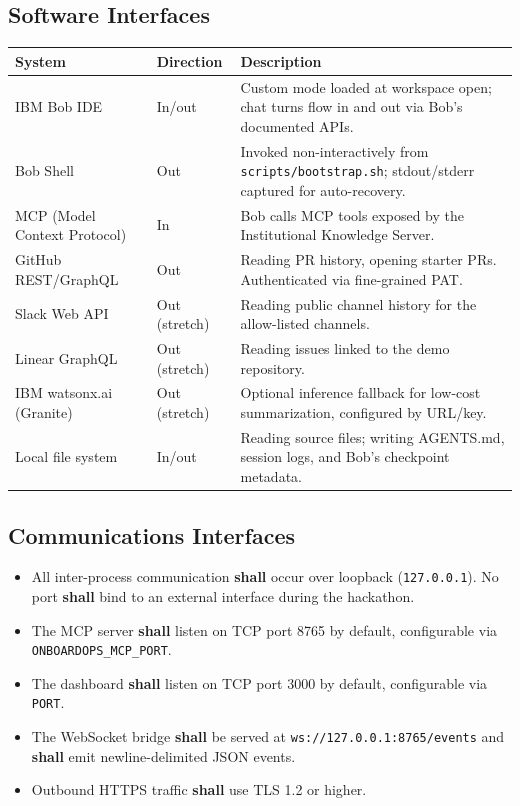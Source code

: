 \documentclass[11pt,letterpaper]{article}
\newcommand{\shall}{\textbf{shall}}
\begin{document}
\subsection{Software Interfaces}

\begin{longtable}{|p{3.4cm}|p{3.2cm}|p{7.4cm}|}
\hline
\textbf{System} & \textbf{Direction} & \textbf{Description} \\
\hline
\endhead
IBM Bob IDE & In/out & Custom mode loaded at workspace open; chat turns flow in and out via Bob's documented APIs. \\
\hline
Bob Shell & Out & Invoked non-interactively from \texttt{scripts/bootstrap.sh}; stdout/stderr captured for auto-recovery. \\
\hline
MCP (Model Context Protocol) & In & Bob calls MCP tools exposed by the Institutional Knowledge Server. \\
\hline
GitHub REST/GraphQL & Out & Reading PR history, opening starter PRs. Authenticated via fine-grained PAT. \\
\hline
Slack Web API & Out (stretch) & Reading public channel history for the allow-listed channels. \\
\hline
Linear GraphQL & Out (stretch) & Reading issues linked to the demo repository. \\
\hline
IBM watsonx.ai (Granite) & Out (stretch) & Optional inference fallback for low-cost summarization, configured by URL/key. \\
\hline
Local file system & In/out & Reading source files; writing AGENTS.md, session logs, and Bob's checkpoint metadata. \\
\hline
\end{longtable}

\subsection{Communications Interfaces}

\begin{itemize}
  \item All inter-process communication \shall{} occur over loopback (\texttt{127.0.0.1}). No port \shall{} bind to an external interface during the hackathon.
  \item The MCP server \shall{} listen on TCP port 8765 by default, configurable via \texttt{ONBOARDOPS\_MCP\_PORT}.
  \item The dashboard \shall{} listen on TCP port 3000 by default, configurable via \texttt{PORT}.
  \item The WebSocket bridge \shall{} be served at \texttt{ws://127.0.0.1:8765/events} and \shall{} emit newline-delimited JSON events.
  \item Outbound HTTPS traffic \shall{} use TLS 1.2 or higher.
\end{itemize}
\end{document}
